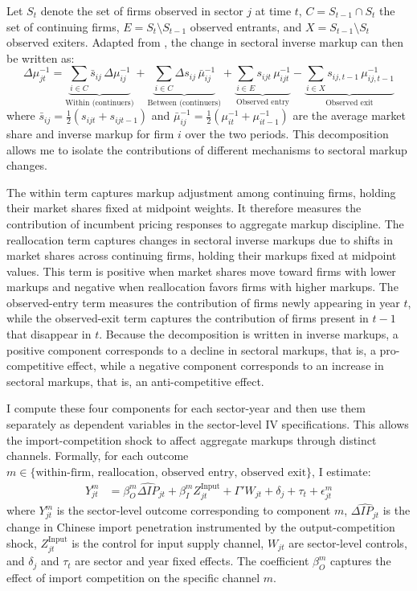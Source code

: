 ﻿\documentclass[12pt]{article}
\begin{document}
Let $S_t$ denote the set of firms observed in sector $j$ at time $t$, $C = S_{t-1} \cap S_t$ the set of continuing firms, $E = S_t \setminus S_{t-1}$ observed entrants, and $X = S_{t-1} \setminus S_t$ observed exiters. Adapted from \textcite{melitzDynamicOlleyPakesProductivity2015}, the change in sectoral inverse markup can then be written as:
\[\Delta \mu_{jt}^{-1}
=
\underbrace{\sum_{i \in C} \bar{s}_{ij}\,\Delta \mu_{ij}^{-1}}_{\text{Within (continuers)}}
+
\underbrace{\sum_{i \in C} \Delta s_{ij}\,\bar{\mu}_{ij}^{-1}}_{\text{Between (continuers)}}
+
\underbrace{\sum_{i \in E} s_{ijt}\,\mu_{ijt}^{-1}}_{\text{Observed entry}} - \underbrace{\sum_{i \in X} s_{ij,t-1}\,\mu_{ij,t-1}^{-1}}_{\text{Observed exit}}\]
where $\bar{s}_{ij} = \frac{1}{2}(s_{ijt} + s_{ijt-1})$ and $\bar{\mu}_{ij}^{-1} = \frac{1}{2}(\mu_{it}^{-1} + \mu_{it-1}^{-1})$ are the average market share and inverse markup for firm $i$ over the two periods. This decomposition allows me to isolate the contributions of different mechanisms to sectoral markup changes.

The within term captures markup adjustment among continuing firms, holding their market shares fixed at midpoint weights. It therefore measures the contribution of incumbent pricing responses to aggregate markup discipline. The reallocation term captures changes in sectoral inverse markups due to shifts in market shares across continuing firms, holding their markups fixed at midpoint values. This term is positive when market shares move toward firms with lower markups and negative when reallocation favors firms with higher markups. The observed-entry term measures the contribution of firms newly appearing in year $t$, while the observed-exit term captures the contribution of firms present in $t-1$ that disappear in $t$. Because the decomposition is written in inverse markups, a positive component corresponds to a decline in sectoral markups, that is, a pro-competitive effect, while a negative component corresponds to an increase in sectoral markups, that is, an anti-competitive effect.

I compute these four components for each sector-year and then use them separately as dependent variables in the sector-level IV specifications. This allows the import-competition shock to affect aggregate markups through distinct channels. Formally, for each outcome $m \in \{ \text{within-firm, reallocation, observed entry, observed exit} \}$, I estimate: 
\begin{equation}
\begin{aligned}
    Y^m_{jt} &= \beta_O^m \widehat{\Delta IP}_{jt} + \beta_I^m Z_{jt}^{\text{Input}} + \Gamma' W_{jt} + \delta_j + \tau_t + \epsilon_{jt}^m
\end{aligned}
\end{equation}
where $Y^m_{jt}$ is the sector-level outcome corresponding to component $m$, $\widehat{\Delta IP_{jt}}$ is the change in Chinese import penetration instrumented by the output-competition shock, $Z_{jt}^{\text{Input}}$ is the control for input supply channel, $W_{jt}$ are sector-level controls, and $\delta_j$ and $\tau_t$ are sector and year fixed effects. The coefficient $\beta_O^m$ captures the effect of import competition on the specific channel $m$.
\end{document}
